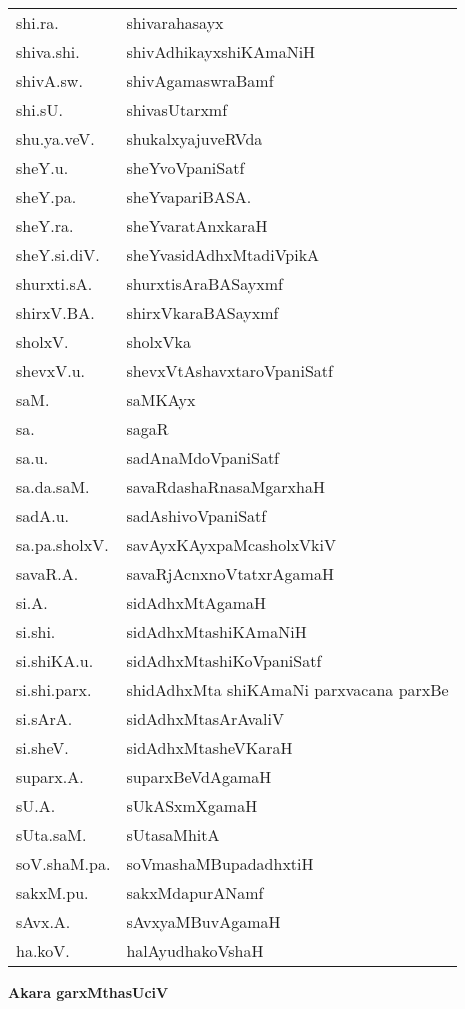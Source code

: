 \begin{longtable}{ll}
shi.ra. & shivarahasayx\\
shiva.shi. & shivAdhikayxshiKAmaNiH\\
shivA.sw. & shivAgamaswraBamf\\
shi.sU. & shivasUtarxmf\\
shu.ya.veV. & shukalxyajuveRVda\\
sheY.u. & sheYvoVpaniSatf\\
sheY.pa. & sheYvapariBASA.\\
sheY.ra. & sheYvaratAnxkaraH\\
sheY.si.diV. & sheYvasidAdhxMtadiVpikA\\
shurxti.sA. & shurxtisAraBASayxmf\\
shirxV.BA. & shirxVkaraBASayxmf\\
sholxV. & sholxVka\\
shevxV.u. & shevxVtAshavxtaroVpaniSatf\\
saM. & saMKAyx\\
sa. & sagaR\\
sa.u. & sadAnaMdoVpaniSatf\\
sa.da.saM. & savaRdashaRnasaMgarxhaH\\
sadA.u. & sadAshivoVpaniSatf\\
sa.pa.sholxV. & savAyxKAyxpaMcasholxVkiV\\
savaR.A. & savaRjAcnxnoVtatxrAgamaH\\
si.A. & sidAdhxMtAgamaH\\
si.shi. & sidAdhxMtashiKAmaNiH\\
si.shiKA.u. & sidAdhxMtashiKoVpaniSatf\\
si.shi.parx. & shidAdhxMta shiKAmaNi parxvacana parxBe\\
si.sArA. & sidAdhxMtasArAvaliV\\
si.sheV. & sidAdhxMtasheVKaraH\\
suparx.A. & suparxBeVdAgamaH\\
sU.A. & sUkASxmXgamaH\\
sUta.saM. & sUtasaMhitA\\
soV.shaM.pa. & soVmashaMBupadadhxtiH\\
sakxM.pu. & sakxMdapurANamf\\
sAvx.A. & sAvxyaMBuvAgamaH\\
ha.koV. & halAyudhakoVshaH\\
\end{longtable}

\vskip 1cm

\begin{center}
{\Large\bf Akara garxMthasUciV}
\end{center}

